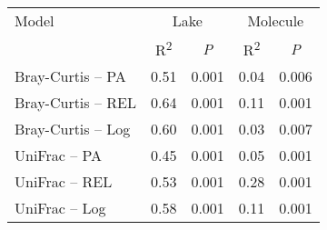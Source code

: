 \begin{table}[ht]
\centering
\begin{tabular}{l r r r r }
  \hline
\hline
  Model & \multicolumn{2}{c}{Lake} & \multicolumn{2}{c}{Molecule} \\
  & \multicolumn{1}{c}{R\textsuperscript{2}} & 
                          \multicolumn{1}{c}{\emph{P}} & 
                          \multicolumn{1}{c}{R\textsuperscript{2}} & 
                          \multicolumn{1}{c}{\emph{P}} \\
 \hline
Bray-Curtis -- PA & 0.51 & 0.001 & 0.04 & 0.006 \\ 
  Bray-Curtis -- REL & 0.64 & 0.001 & 0.11 & 0.001 \\ 
  Bray-Curtis -- Log & 0.60 & 0.001 & 0.03 & 0.007 \\ 
  UniFrac -- PA & 0.45 & 0.001 & 0.05 & 0.001 \\ 
  UniFrac -- REL & 0.53 & 0.001 & 0.28 & 0.001 \\ 
  UniFrac -- Log & 0.58 & 0.001 & 0.11 & 0.001 \\ 
   \hline
\end{tabular}
\end{table}
